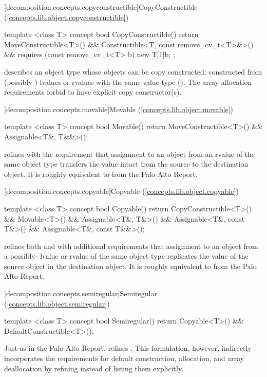 [decomposition.concepts.copyconstructible]{CopyConstructible (\ref{concepts.lib.object.copyconstructible})}
\begin{codeblock}
template <class T>
concept bool CopyConstructible() {
  return MoveConstructible<T>() &&
    Constructible<T, const remove_cv_t<T>&>() &&
    requires (const remove_cv_t<T> b) {
      new T[1]{b};
    };
}
\end{codeblock}
 describes an object type  whose objects can be copy constructed:
constructed from (possibly ) lvalues or  rvalues with the same value type
(). The array allocation requirements forbid  to have explicit
copy constructor(s).

[decomposition.concepts.movable]{Movable (\ref{concepts.lib.object.movable})}
\begin{codeblock}
template <class T>
concept bool Movable() {
  return MoveConstructible<T>() &&
    Assignable<T&, T&&>();
}
\end{codeblock}
 refines  with the requirement that assignment to an object
from an rvalue of the same object type transfers the value intact from the source to the destination
object. It is roughly equivalent to  from the Palo Alto Report.

[decomposition.concepts.copyable]{Copyable (\ref{concepts.lib.object.copyable})}
\begin{codeblock}
template <class T>
concept bool Copyable() {
  return CopyConstructible<T>() &&
    Movable<T>() &&
    Assignable<T&, T&>() &&
    Assignable<T&, const T&>() &&
    Assignable<T&, const T&&>();
}
\end{codeblock}
 refines both  and  with additional
requirements that assignment to an object from a possibly- lvalue or 
rvalue of the same object type replicates the value of the source object in the destination object.
It is roughly equivalent to  from the Palo Alto Report.

[decomposition.concepts.semiregular]{Semiregular (\ref{concepts.lib.object.semiregular})}
\begin{codeblock}
template <class T>
concept bool Semiregular() {
  return Copyable<T>() &&
    DefaultConstructible<T>();
}
\end{codeblock}
Just as in the Palo Alto Report,  refines . This formulation,
however, indirectly incorporates the requirements for default construction, allocation, and array
deallocation by refining  instead of listing them explicitly.

